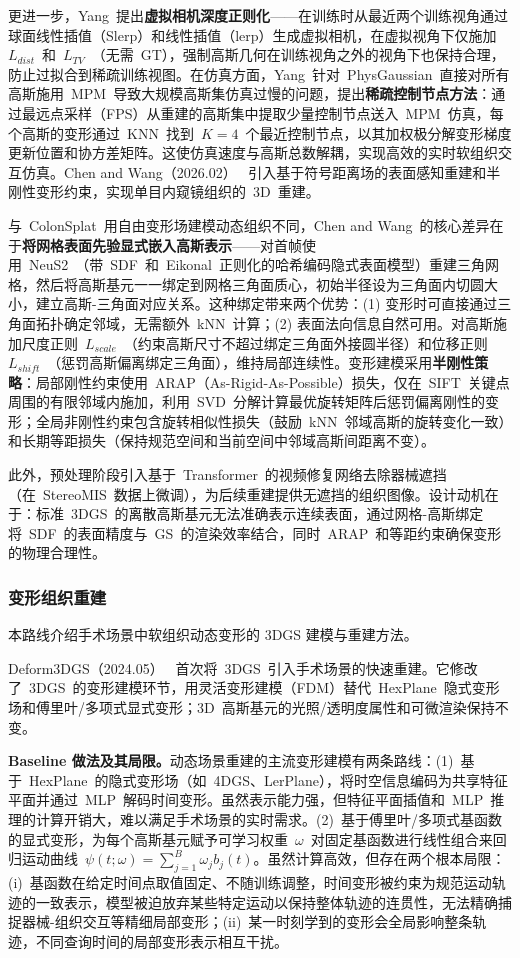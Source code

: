 更进一步，Yang~提出\textbf{虚拟相机深度正则化}——在训练时从最近两个训练视角通过球面线性插值（Slerp）和线性插值（lerp）生成虚拟相机，在虚拟视角下仅施加~$L_{dist}$~和~$L_{TV}$~（无需~GT），强制高斯几何在训练视角之外的视角下也保持合理，防止过拟合到稀疏训练视图。在仿真方面，Yang~针对~PhysGaussian~直接对所有高斯施用~MPM~导致大规模高斯集仿真过慢的问题，提出\textbf{稀疏控制节点方法}：通过最远点采样（FPS）从重建的高斯集中提取少量控制节点送入~MPM~仿真，每个高斯的变形通过~KNN~找到~$K=4$~个最近控制节点，以其加权极分解变形梯度更新位置和协方差矩阵。这使仿真速度与高斯总数解耦，实现高效的实时软组织交互仿真。Chen and Wang（2026.02）~\cite{2602_20718} 引入基于符号距离场的表面感知重建和半刚性变形约束，实现单目内窥镜组织的~3D~重建。

与~ColonSplat~用自由变形场建模动态组织不同，Chen and Wang~的核心差异在于\textbf{将网格表面先验显式嵌入高斯表示}——对首帧使用~NeuS2~（带~SDF~和~Eikonal~正则化的哈希编码隐式表面模型）重建三角网格，然后将高斯基元一一绑定到网格三角面质心，初始半径设为三角面内切圆大小，建立高斯-三角面对应关系。这种绑定带来两个优势：(1) 变形时可直接通过三角面拓扑确定邻域，无需额外~kNN~计算；(2) 表面法向信息自然可用。对高斯施加尺度正则~$L_{scale}$~（约束高斯尺寸不超过绑定三角面外接圆半径）和位移正则~$L_{shift}$~（惩罚高斯偏离绑定三角面），维持局部连续性。变形建模采用\textbf{半刚性策略}：局部刚性约束使用~ARAP（As-Rigid-As-Possible）损失，仅在~SIFT~关键点周围的有限邻域内施加，利用~SVD~分解计算最优旋转矩阵后惩罚偏离刚性的变形；全局非刚性约束包含旋转相似性损失（鼓励~kNN~邻域高斯的旋转变化一致）和长期等距损失（保持规范空间和当前空间中邻域高斯间距离不变）。

此外，预处理阶段引入基于~Transformer~的视频修复网络去除器械遮挡（在~StereoMIS~数据上微调），为后续重建提供无遮挡的组织图像。设计动机在于：标准~3DGS~的离散高斯基元无法准确表示连续表面，通过网格-高斯绑定将~SDF~的表面精度与~GS~的渲染效率结合，同时~ARAP~和等距约束确保变形的物理合理性。

\subsubsection{变形组织重建}

本路线介绍手术场景中软组织动态变形的 3DGS 建模与重建方法。

Deform3DGS（2024.05）~\cite{2405_17835} 首次将~3DGS~引入手术场景的快速重建。它修改了~3DGS~的变形建模环节，用灵活变形建模（FDM）替代~HexPlane~隐式变形场和傅里叶/多项式显式变形；3D~高斯基元的光照/透明度属性和可微渲染保持不变。

\textbf{Baseline 做法及其局限。}动态场景重建的主流变形建模有两条路线：(1)~基于~HexPlane~的隐式变形场（如~4DGS、LerPlane），将时空信息编码为共享特征平面并通过~MLP~解码时间变形。虽然表示能力强，但特征平面插值和~MLP~推理的计算开销大，难以满足手术场景的实时需求。(2)~基于傅里叶/多项式基函数的显式变形，为每个高斯基元赋予可学习权重~$\omega$~对固定基函数进行线性组合来回归运动曲线~$\psi(t;\omega)=\sum_{j=1}^{B}\omega_j b_j(t)$。虽然计算高效，但存在两个根本局限：(i)~基函数在给定时间点取值固定、不随训练调整，时间变形被约束为规范运动轨迹的一致表示，模型被迫放弃某些特定运动以保持整体轨迹的连贯性，无法精确捕捉器械-组织交互等精细局部变形；(ii)~某一时刻学到的变形会全局影响整条轨迹，不同查询时间的局部变形表示相互干扰。

